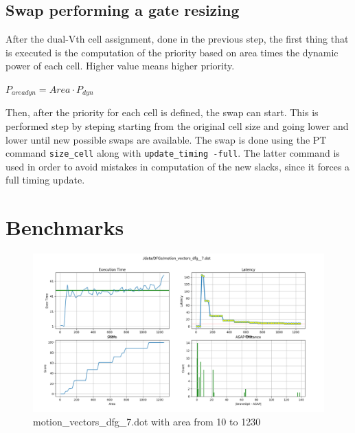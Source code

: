 \documentclass{article}
\begin{document}
	\subsection{Swap performing a gate resizing}
	After the dual-Vth cell assignment, done in the previous step, the first thing that is executed is the computation of the priority based on area times the dynamic power of each cell. Higher value means higher priority.
	
	\begin{center}
		$P_{areadyn} = Area \cdot P_{dyn}$
	\end{center}
	
	
	Then, after the priority for each cell is defined, the swap can start. This is performed step by steping starting from the original cell size and going lower and lower until new possible swaps are available. The swap is done using the PT command \texttt{size\_cell} along with \texttt{update\_timing -full}. The latter command is used in order to avoid mistakes in computation of the new slacks, since it forces a full timing update. 

	\newpage
	\section{Benchmarks}
	
	\begin{figure}[ht]
		\centering
		\includegraphics[width=1\textwidth]{Immagini/benchmark1.png}
		\caption{motion\_vectors\_dfg\_7.dot with area from 10 to 1230}
		\label{benchmark1}
	\end{figure}
	
	
\end{document}
